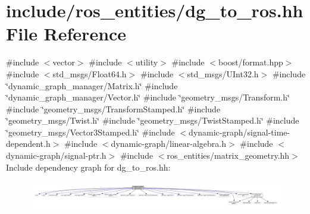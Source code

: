 \hypertarget{dg__to__ros_8hh}{}\section{include/ros\+\_\+entities/dg\+\_\+to\+\_\+ros.hh File Reference}
\label{dg__to__ros_8hh}
{\ttfamily \#include $<$vector$>$}\newline
{\ttfamily \#include $<$utility$>$}\newline
{\ttfamily \#include $<$boost/format.\+hpp$>$}\newline
{\ttfamily \#include $<$std\+\_\+msgs/\+Float64.\+h$>$}\newline
{\ttfamily \#include $<$std\+\_\+msgs/\+U\+Int32.\+h$>$}\newline
{\ttfamily \#include \char`\"{}dynamic\+\_\+graph\+\_\+manager/\+Matrix.\+h\char`\"{}}\newline
{\ttfamily \#include \char`\"{}dynamic\+\_\+graph\+\_\+manager/\+Vector.\+h\char`\"{}}\newline
{\ttfamily \#include \char`\"{}geometry\+\_\+msgs/\+Transform.\+h\char`\"{}}\newline
{\ttfamily \#include \char`\"{}geometry\+\_\+msgs/\+Transform\+Stamped.\+h\char`\"{}}\newline
{\ttfamily \#include \char`\"{}geometry\+\_\+msgs/\+Twist.\+h\char`\"{}}\newline
{\ttfamily \#include \char`\"{}geometry\+\_\+msgs/\+Twist\+Stamped.\+h\char`\"{}}\newline
{\ttfamily \#include \char`\"{}geometry\+\_\+msgs/\+Vector3\+Stamped.\+h\char`\"{}}\newline
{\ttfamily \#include $<$dynamic-\/graph/signal-\/time-\/dependent.\+h$>$}\newline
{\ttfamily \#include $<$dynamic-\/graph/linear-\/algebra.\+h$>$}\newline
{\ttfamily \#include $<$dynamic-\/graph/signal-\/ptr.\+h$>$}\newline
{\ttfamily \#include $<$ros\+\_\+entities/matrix\+\_\+geometry.\+hh$>$}\newline
Include dependency graph for dg\+\_\+to\+\_\+ros.\+hh\+:
\nopagebreak
\begin{figure}[H]
\begin{center}
\leavevmode
\includegraphics[width=350pt]{dg__to__ros_8hh__incl}
\end{center}
\end{figure}
